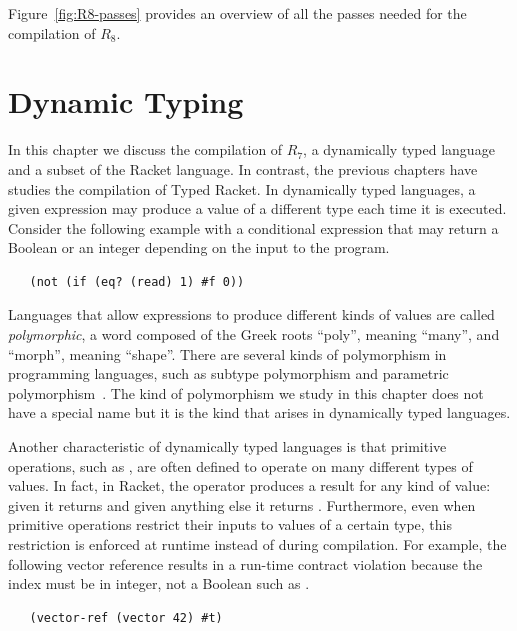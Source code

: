\documentclass[11pt]{book}
\begin{document}
Figure~\ref{fig:R8-passes} provides an overview of all the passes needed
for the compilation of $R_8$.



\chapter{Dynamic Typing}
\label{ch:type-dynamic}

In this chapter we discuss the compilation of $R_7$, a dynamically
typed language and a subset of the Racket language. In contrast, the
previous chapters have studies the compilation of Typed Racket. In
dynamically typed languages, a given expression may produce a value of
a different type each time it is executed. Consider the following
example with a conditional  expression that may return a
Boolean or an integer depending on the input to the program.
\begin{lstlisting}
   (not (if (eq? (read) 1) #f 0))
\end{lstlisting}
Languages that allow expressions to produce different kinds of values
are called \emph{polymorphic}, a word composed of the Greek roots
``poly'', meaning ``many'', and ``morph'', meaning ``shape''.  There
are several kinds of polymorphism in programming languages, such as
subtype polymorphism and parametric
polymorphism~\citep{Cardelli:1985kx}. The kind of polymorphism we
study in this chapter does not have a special name but it is the kind
that arises in dynamically typed languages.

Another characteristic of dynamically typed languages is that
primitive operations, such as , are often defined to operate
on many different types of values. In fact, in Racket, the 
operator produces a result for any kind of value: given  it
returns  and given anything else it returns .
Furthermore, even when primitive operations restrict their inputs to
values of a certain type, this restriction is enforced at runtime
instead of during compilation. For example, the following vector
reference results in a run-time contract violation because the index
must be in integer, not a Boolean such as .
\begin{lstlisting}
   (vector-ref (vector 42) #t)
\end{lstlisting}
\end{document}
